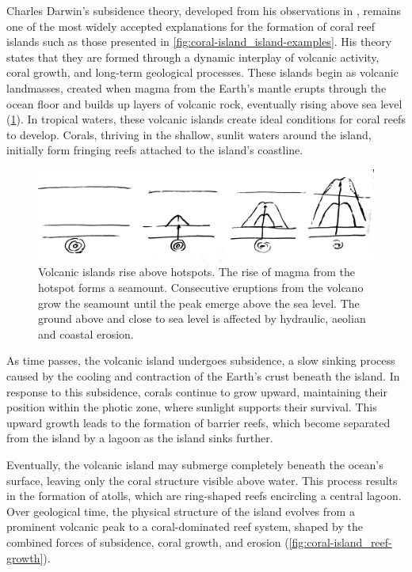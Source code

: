 Charles Darwin's subsidence theory, developed from his observations in \citep{Darwin1842}, remains one of the most widely accepted explanations for the formation of coral reef islands such as those presented in \cref{fig:coral-island_island-examples}. His theory states that they are formed through a dynamic interplay of volcanic activity, coral growth, and long-term geological processes. These islands begin as volcanic landmasses, created when magma from the Earth's mantle erupts through the ocean floor and builds up layers of volcanic rock, eventually rising above sea level (\cref{fig:coral-island_island-growth}). In tropical waters, these volcanic islands create ideal conditions for coral reefs to develop. Corals, thriving in the shallow, sunlit waters around the island, initially form fringing reefs attached to the island's coastline.

\begin{figure}[H]
    \centering
    \includegraphics[width = \linewidth]{other_images/Drawings/Volcano.jpg}
    \caption{Volcanic islands rise above hotspots. The rise of magma from the hotspot forms a seamount. Consecutive eruptions from the volcano grow the seamount until the peak emerge above the sea level. The ground above and close to sea level is affected by hydraulic, aeolian and coastal erosion.}
    \label{fig:coral-island_island-growth}
\end{figure}

As time passes, the volcanic island undergoes subsidence, a slow sinking process caused by the cooling and contraction of the Earth's crust beneath the island. In response to this subsidence, corals continue to grow upward, maintaining their position within the photic zone, where sunlight supports their survival. This upward growth leads to the formation of barrier reefs, which become separated from the island by a lagoon as the island sinks further.

Eventually, the volcanic island may submerge completely beneath the ocean's surface, leaving only the coral structure visible above water. This process results in the formation of atolls, which are ring-shaped reefs encircling a central lagoon. Over geological time, the physical structure of the island evolves from a prominent volcanic peak to a coral-dominated reef system, shaped by the combined forces of subsidence, coral growth, and erosion (\cref{fig:coral-island_reef-growth}).

